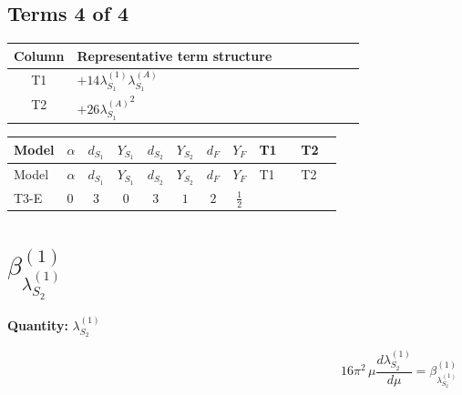 \documentclass[8pt]{article}
\begin{document}
\begin{landscape}
\subsection*{Terms 4 of 4}
\begin{center}
\begin{tabular}{@{}c >{\raggedright\arraybackslash}p{0.82\linewidth}@{}}
\toprule
Column & Representative term structure \\
\midrule
T1 & \(\displaystyle +14 {\lambda_{S_1}^{(1)}} {\lambda_{S_1}^{(A)}}\) \\
\midrule
T2 & \(\displaystyle +26 {\lambda_{S_1}^{(A)}}^2\) \\
\midrule
\bottomrule
\end{tabular}
\end{center}
\smallskip
\tiny
\begin{longtable}{@{}llcccccc >{\raggedright\arraybackslash}p{0.21\linewidth} >{\raggedright\arraybackslash}p{0.21\linewidth}@{}}
\toprule
Model & $\alpha$ & $d_{S_1}$ & $Y_{S_1}$ & $d_{S_2}$ & $Y_{S_2}$ & $d_F$ & $Y_F$ & T1 & T2 \\
\midrule
\endfirsthead
\toprule
Model & $\alpha$ & $d_{S_1}$ & $Y_{S_1}$ & $d_{S_2}$ & $Y_{S_2}$ & $d_F$ & $Y_F$ & T1 & T2 \\
\midrule
\endhead
T3-E & $0$ & $3$ & $0$ & $3$ & $1$ & $2$ & $\frac{1}{2}$ & \scriptsize\adjustbox{max width=\linewidth}{$\begin{gathered} +14 {\lambda_{S_1}^{(1)}} {\lambda_{S_1}^{(A)}}\end{gathered}$} & \scriptsize\adjustbox{max width=\linewidth}{$\begin{gathered} +26 {\lambda_{S_1}^{(A)}}^2\end{gathered}$} \\
\midrule
\bottomrule
\end{longtable}
\clearpage
\section*{$\beta_{\lambda_{S_2}^{(1)}}^{(1)}$}
\noindent\textbf{Quantity: }$\lambda_{S_2}^{(1)}$\par\smallskip
\[16\pi^2\,\mu\frac{d \lambda_{S_2}^{(1)}}{d\mu}=\beta_{\lambda_{S_2}^{(1)}}^{(1)}\]

\end{landscape}
\end{document}
